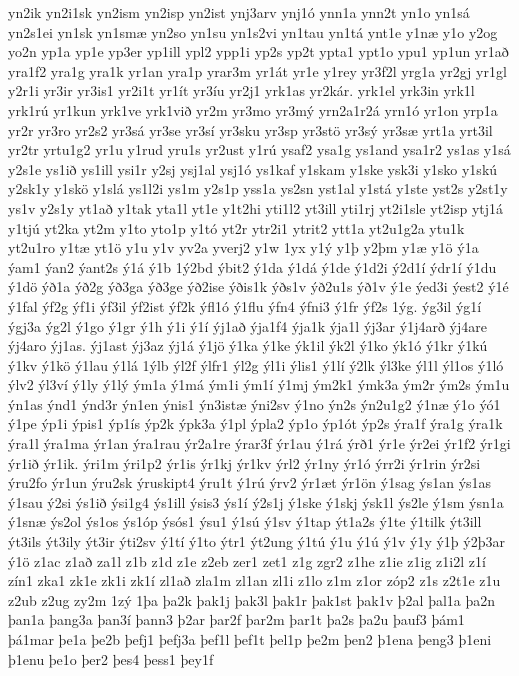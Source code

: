 {yn2ik
yn2i1sk
yn2ism
yn2isp
yn2ist
ynj3arv
ynj1ó
ynn1a
ynn2t
yn1o
yn1sá
yn2s1ei
yn1sk
yn1smæ
yn2so
yn1su
yn1s2vi
yn1tau
yn1tá
ynt1e
y1næ
y1o
y2og
yo2n
yp1a
yp1e
yp3er
yp1ill
ypl2
ypp1i
yp2s
yp2t
ypta1
ypt1o
ypu1
yp1un
yr1að
yra1f2
yra1g
yra1k
yr1an
yra1p
yrar3m
yr1át
yr1e
y1rey
yr3f2l
yrg1a
yr2gj
yr1gl
y2r1i
yr3ir
yr3is1
yr2i1t
yr1ít
yr3íu
yr2j1
yrk1as
yr2kár.
yrk1el
yrk3in
yrk1l
yrk1rú
yr1kun
yrk1ve
yrk1við
yr2m
yr3mo
yr3mý
yrn2a1r2á
yrn1ó
yr1on
yrp1a
yr2r
yr3ro
yr2s2
yr3sá
yr3se
yr3sí
yr3sku
yr3sp
yr3stö
yr3sý
yr3sæ
yrt1a
yrt3il
yr2tr
yrtu1g2
yr1u
y1rud
yru1s
yr2ust
y1rú
ysaf2
ysa1g
ys1and
ysa1r2
ys1as
y1sá
y2s1e
ys1ið
ys1ill
ysi1r
y2sj
ysj1al
ysj1ó
ys1kaf
y1skam
y1ske
ysk3i
y1sko
y1skú
y2sk1y
y1skö
y1slá
ys1l2i
ys1m
y2s1p
yss1a
ys2sn
yst1al
y1stá
y1ste
yst2s
y2st1y
ys1v
y2s1y
yt1að
y1tak
yta1l
yt1e
y1t2hi
yti1l2
yt3ill
yti1rj
yt2i1sle
yt2isp
ytj1á
y1tjú
yt2ka
yt2m
y1to
yto1p
y1tó
yt2r
ytr2i1
ytrit2
ytt1a
yt2u1g2a
ytu1k
yt2u1ro
y1tæ
yt1ö
y1u
y1v
yv2a
yverj2
y1w
1yx
y1ý
y1þ
y2þm
y1æ
y1ö
ý1a
ýam1
ýan2
ýant2s
ý1á
ý1b
1ý2bd
ýbit2
ý1da
ý1dá
ý1de
ý1d2i
ý2d1í
ýdr1í
ý1du
ý1dö
ýð1a
ýð2g
ýð3ga
ýð3ge
ýð2ise
ýðis1k
ýðs1v
ýð2u1s
ýð1v
ý1e
ýed3i
ýest2
ý1é
ý1fal
ýf2g
ýf1i
ýf3il
ýf2ist
ýf2k
ýfl1ó
ý1flu
ýfn4
ýfni3
ý1fr
ýf2s
1ýg.
ýg3il
ýg1í
ýgj3a
ýg2l
ý1go
ý1gr
ý1h
ý1i
ý1í
ýj1að
ýja1f4
ýja1k
ýja1l
ýj3ar
ý1j4arð
ýj4are
ýj4aro
ýj1as.
ýj1ast
ýj3az
ýj1á
ý1jö
ý1ka
ý1ke
ýk1il
ýk2l
ý1ko
ýk1ó
ý1kr
ý1kú
ý1kv
ý1kö
ý1lau
ý1lá
1ýlb
ýl2f
ýlfr1
ýl2g
ýl1i
ýlis1
ý1lí
ý2lk
ýl3ke
ýl1l
ýl1os
ý1ló
ýlv2
ýl3ví
ý1ly
ý1lý
ým1a
ý1má
ým1i
ým1í
ý1mj
ým2k1
ýmk3a
ým2r
ým2s
ým1u
ýn1as
ýnd1
ýnd3r
ýn1en
ýnis1
ýn3istæ
ýni2sv
ý1no
ýn2s
ýn2u1g2
ý1næ
ý1o
ýó1
ý1pe
ýp1i
ýpis1
ýp1ís
ýp2k
ýpk3a
ý1pl
ýpla2
ýp1o
ýp1ót
ýp2s
ýra1f
ýra1g
ýra1k
ýra1l
ýra1ma
ýr1an
ýra1rau
ýr2a1re
ýrar3f
ýr1au
ý1rá
ýrð1
ýr1e
ýr2ei
ýr1f2
ýr1gi
ýr1ið
ýr1ik.
ýri1m
ýri1p2
ýr1is
ýr1kj
ýr1kv
ýrl2
ýr1ny
ýr1ó
ýrr2i
ýr1rin
ýr2si
ýru2fo
ýr1un
ýru2sk
ýruskipt4
ýru1t
ý1rú
ýrv2
ýr1æt
ýr1ön
ý1sag
ýs1an
ýs1as
ý1sau
ý2si
ýs1ið
ýsi1g4
ýs1ill
ýsis3
ýs1í
ý2s1j
ý1ske
ý1skj
ýsk1l
ýs2le
ý1sm
ýsn1a
ý1snæ
ýs2ol
ýs1os
ýs1óp
ýsós1
ýsu1
ý1sú
ý1sv
ý1tap
ýt1a2s
ý1te
ý1tilk
ýt3ill
ýt3ils
ýt3ily
ýt3ir
ýti2sv
ý1tí
ý1to
ýtr1
ýt2ung
ý1tú
ý1u
ý1ú
ý1v
ý1y
ý1þ
ý2þ3ar
ý1ö
z1ac
z1að
za1l
z1b
z1d
z1e
z2eb
zer1
zet1
z1g
zgr2
z1he
z1ie
z1ig
z1i2l
z1í
zín1
zka1
zk1e
zk1i
zk1í
zl1að
zla1m
zl1an
zl1i
z1lo
z1m
z1or
zóp2
z1s
z2t1e
z1u
z2ub
z2ug
zy2m
1zý
1þa
þa2k
þak1j
þak3l
þak1r
þak1st
þak1v
þ2al
þal1a
þa2n
þan1a
þang3a
þan3í
þann3
þ2ar
þar2f
þar2m
þar1t
þa2s
þa2u
þauf3
þám1
þá1mar
þe1a
þe2b
þefj1
þefj3a
þef1l
þef1t
þel1p
þe2m
þen2
þ1ena
þeng3
þ1eni
þ1enu
þe1o
þer2
þes4
þess1
þey1f
}
